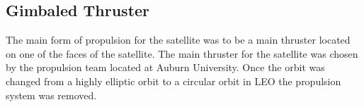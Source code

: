 \documentclass[conf]{new-aiaa}
\begin{document}
\subsection{Gimbaled Thruster}
The main form of propulsion for the satellite was to be a main thruster located on one of the faces of the satellite. The main thruster for the satellite was chosen by the propulsion team located at Auburn University. Once the orbit was changed from a highly elliptic orbit to a circular orbit in LEO the propulsion system was removed. 


\end{document}
